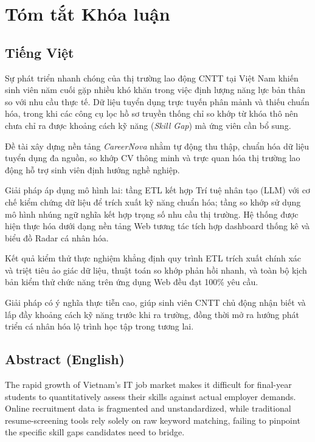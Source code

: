 \chapter*{Tóm tắt Khóa luận}
\label{abstract}

\section*{Tiếng Việt}

Sự phát triển nhanh chóng của thị trường lao động CNTT tại Việt Nam khiến sinh viên năm cuối gặp nhiều khó khăn trong việc định lượng năng lực bản thân so với nhu cầu thực tế. Dữ liệu tuyển dụng trực tuyến phân mảnh và thiếu chuẩn hóa, trong khi các công cụ lọc hồ sơ truyền thống chỉ so khớp từ khóa thô nên chưa chỉ ra được khoảng cách kỹ năng (\textit{Skill Gap}) mà ứng viên cần bổ sung.

Đề tài xây dựng nền tảng \textit{CareerNova} nhằm tự động thu thập, chuẩn hóa dữ liệu tuyển dụng đa nguồn, so khớp CV thông minh và trực quan hóa thị trường lao động hỗ trợ sinh viên định hướng nghề nghiệp.

Giải pháp áp dụng mô hình lai: tầng ETL kết hợp Trí tuệ nhân tạo (LLM) với cơ chế kiểm chứng dữ liệu để trích xuất kỹ năng chuẩn hóa; tầng so khớp sử dụng mô hình nhúng ngữ nghĩa kết hợp trọng số nhu cầu thị trường. Hệ thống được hiện thực hóa dưới dạng nền tảng Web tương tác tích hợp dashboard thống kê và biểu đồ Radar cá nhân hóa.

Kết quả kiểm thử thực nghiệm khẳng định quy trình ETL trích xuất chính xác và triệt tiêu ảo giác dữ liệu, thuật toán so khớp phản hồi nhanh, và toàn bộ kịch bản kiểm thử chức năng trên ứng dụng Web đều đạt 100\% yêu cầu.

Giải pháp có ý nghĩa thực tiễn cao, giúp sinh viên CNTT chủ động nhận biết và lấp đầy khoảng cách kỹ năng trước khi ra trường, đồng thời mở ra hướng phát triển cá nhân hóa lộ trình học tập trong tương lai.

\section*{Abstract (English)}

The rapid growth of Vietnam's IT job market makes it difficult for final-year students to quantitatively assess their skills against actual employer demands. Online recruitment data is fragmented and unstandardized, while traditional resume-screening tools rely solely on raw keyword matching, failing to pinpoint the specific skill gaps candidates need to bridge.

